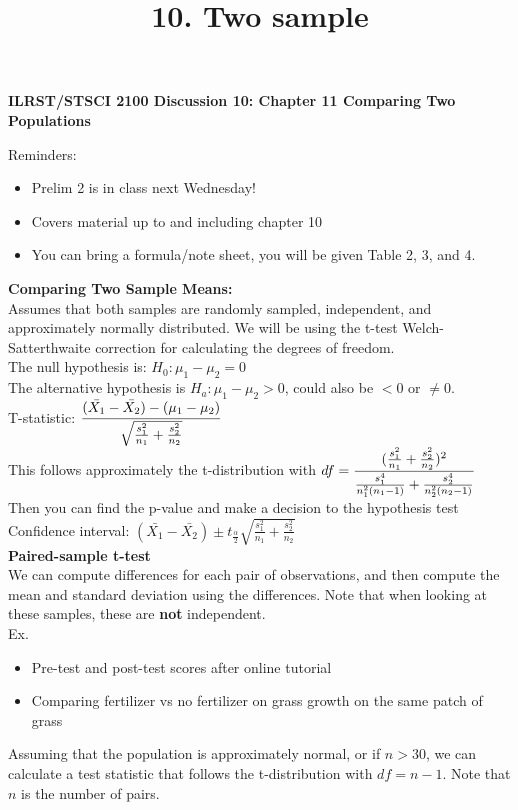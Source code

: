 \documentclass[12pt]{article}
\title{10. Two sample}
\begin{document}
\begin{center}
\textbf{ILRST/STSCI 2100 Discussion 10: Chapter 11 Comparing Two Populations}
\end{center}

\noindent Reminders:
\begin{itemize}
\item Prelim 2 is in class next Wednesday!
\item Covers material up to and including chapter 10
\item You can bring a formula/note sheet, you will be given Table 2, 3, and 4.
\end{itemize}

\noindent \textbf{Comparing Two Sample Means:} \\
Assumes that both samples are randomly sampled, independent, and approximately normally distributed. We will be using the t-test Welch-Satterthwaite correction for calculating the degrees of freedom. \\

\noindent The null hypothesis is: $H_{0}: \mu_{1}-\mu_{2} = 0$\\
The alternative hypothesis is $H_{a}: \mu_{1} - \mu_{2} > 0$, could also be $<0$ or $\neq 0$. \\

\noindent T-statistic: $\cfrac{(\bar{X_{1}}-\bar{X_{2}})-(\mu_{1}-\mu_{2})}{\sqrt{\frac{s_{1}^{2}}{n_{1}}+\frac{s_{2}^{2}}{n_{2}}}}$ \\

\noindent This follows approximately the t-distribution with $df = \cfrac{(\frac{s_{1}^{2}}{n_{1}}+\frac{s_{2}^{2}}{n_{2}})^{2}}{\frac{s_{1}^{4}}{n_{1}^{2}(n_{1}-1)}+\frac{s_{2}^{4}}{n_{2}^{2}(n_{2}-1)}}$ \\

\noindent Then you can find the p-value and make a decision to the hypothesis test\\

\noindent Confidence interval: $(\bar{X_{1}}-\bar{X_{2}}) \pm t_{\frac{\alpha}{2}} \sqrt{\frac{s_{1}^{2}}{n_{1}}+\frac{s_{2}^{2}}{n_{2}}}$ \\


\noindent \textbf{Paired-sample t-test}\\
We can compute differences for each pair of observations, and then compute the mean and standard deviation using the differences. Note that when looking at these samples, these are \textbf{not} independent.\\
\noindent Ex.
\begin{itemize}[noitemsep,nolistsep]
\item Pre-test and post-test scores after online tutorial
\item Comparing fertilizer vs no fertilizer on grass growth on the same patch of grass\\
\end{itemize}
Assuming that the population is approximately normal, or if $n>30$, we can calculate a test statistic that follows the t-distribution with $df = n-1$. Note that $n$ is the number of pairs. \\
\end{document}
